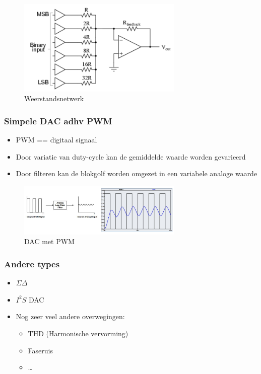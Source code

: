 \documentclass{article}
\begin{document}
\begin{figure}[H]
    \centering
    \includegraphics[width=0.7\textwidth]{Screenshot_20200224_123043.png}
    \caption{Weerstandsnetwerk}
\end{figure}

\subsubsection{Simpele DAC adhv PWM}
\begin{itemize}
    \item PWM == digitaal signaal
    \item Door variatie van duty-cycle kan de gemiddelde waarde worden gevarieerd
    \item Door filteren kan de blokgolf worden omgezet in een variabele analoge waarde 
\end{itemize}

\begin{figure}[H]
    \centering
    \includegraphics[width=0.7\textwidth]{Screenshot_20200224_123240.png}
    \caption{DAC met PWM}
\end{figure}

\subsubsection{Andere types}
\begin{itemize}
    \item $\Sigma\Delta$
    \item $I^2S$ DAC
    \item Nog zeer veel andere overwegingen:
    \begin{itemize}
        \item THD (Harmonische vervorming)
        \item Faseruis
        \item \dots
    \end{itemize}
\end{itemize}
\end{document}

